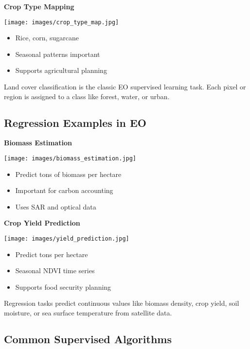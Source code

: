 \documentclass[
  letterpaper,
  DIV=11,
  numbers=noendperiod]{scrartcl}
\providecommand{\tightlist}{%
  \setlength{\itemsep}{0pt}\setlength{\parskip}{0pt}}
\begin{document}
\textbf{Crop Type Mapping}

\texttt{[image: images/crop\_type\_map.jpg]}

\begin{itemize}
\tightlist
\item
  Rice, corn, sugarcane
\item
  Seasonal patterns important
\item
  Supports agricultural planning
\end{itemize}

Land cover classification is the classic EO supervised learning task.
Each pixel or region is assigned to a class like forest, water, or
urban.

\subsection{Regression Examples in EO}\label{regression-examples-in-eo}

\textbf{Biomass Estimation}

\texttt{[image: images/biomass\_estimation.jpg]}

\begin{itemize}
\tightlist
\item
  Predict tons of biomass per hectare
\item
  Important for carbon accounting
\item
  Uses SAR and optical data
\end{itemize}

\textbf{Crop Yield Prediction}

\texttt{[image: images/yield\_prediction.jpg]}

\begin{itemize}
\tightlist
\item
  Predict tons per hectare
\item
  Seasonal NDVI time series
\item
  Supports food security planning
\end{itemize}

Regression tasks predict continuous values like biomass density, crop
yield, soil moisture, or sea surface temperature from satellite data.

\subsection{Common Supervised
Algorithms}\label{common-supervised-algorithms}
\end{document}
